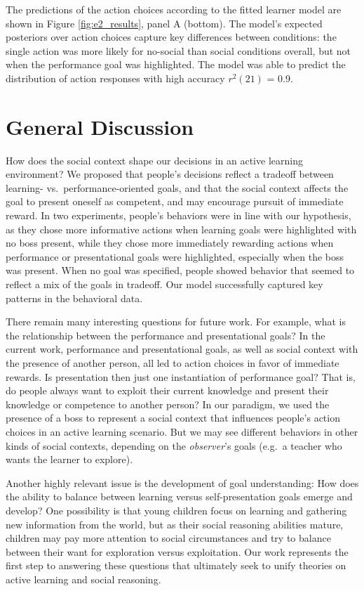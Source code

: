 \documentclass[10pt, letterpaper]{article}
\begin{document}
The predictions of the action choices according to the fitted learner
model are shown in Figure \ref{fig:e2_results}, panel A (bottom). The
model's expected posteriors over action choices capture key differences
between conditions: the single action was more likely for no-social than
social conditions overall, but not when the performance goal was
highlighted. The model was able to predict the distribution of action
responses with high accuracy \(r^2(21)\) = 0.9.

\section{General Discussion}\label{general-discussion}

How does the social context shape our decisions in an active learning
environment? We proposed that people's decisions reflect a tradeoff
between learning- vs.~performance-oriented goals, and that the social
context affects the goal to present oneself as competent, and may
encourage pursuit of immediate reward. In two experiments, people's
behaviors were in line with our hypothesis, as they chose more
informative actions when learning goals were highlighted with no boss
present, while they chose more immediately rewarding actions when
performance or presentational goals were highlighted, especially when
the boss was present. When no goal was specified, people showed behavior
that seemed to reflect a mix of the goals in tradeoff. Our model
successfully captured key patterns in the behavioral data.

There remain many interesting questions for future work. For example,
what is the relationship between the performance and presentational
goals? In the current work, performance and presentational goals, as
well as social context with the presence of another person, all led to
action choices in favor of immediate rewards. Is presentation then just
one instantiation of performance goal? That is, do people always want to
exploit their current knowledge and present their knowledge or
competence to another person? In our paradigm, we used the presence of a
boss to represent a social context that influences people's action
choices in an active learning scenario. But we may see different
behaviors in other kinds of social contexts, depending on the
\emph{observer}'s goals (e.g.~a teacher who wants the learner to
explore).

Another highly relevant issue is the development of goal understanding:
How does the ability to balance between learning versus
self-presentation goals emerge and develop? One possibility is that
young children focus on learning and gathering new information from the
world, but as their social reasoning abilities mature, children may pay
more attention to social circumstances and try to balance between their
want for exploration versus exploitation. Our work represents the first
step to answering these questions that ultimately seek to unify theories
on active learning and social reasoning.
\end{document}
